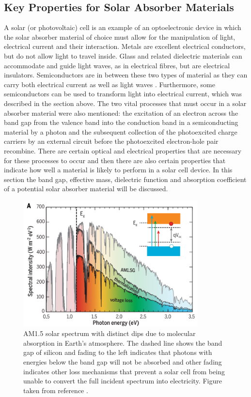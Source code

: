 \subsection{Key Properties for Solar Absorber Materials}\label{PV_properties}

A solar (or photovoltaic) cell is an example of an optoelectronic device in which the solar absorber material of choice must allow for the manipulation of light, electrical current and their interaction. Metals are excellent electrical conductors, but do not allow light to travel inside. Glass and related dielectric materials can accommodate and guide light waves, as in electrical fibres, but are electrical insulators. Semiconductors are in between these two types of material as they can carry both electrical current as well as light waves \cite{mat_prop1}. Furthermore, some semiconductors can be used to transform light into electrical current, which was described in the section above. The two vital processes that must occur in a solar absorber material were also mentioned: the excitation of an electron across the band gap from the valence band into the conduction band in a semiconducting material by a photon and the subsequent collection of the photoexcited charge carriers by an external circuit before the photoexcited electron-hole pair recombine. There are certain optical and electrical properties that are necessary for these processes to occur and then there are also certain properties that indicate how well a material is likely to perform in a solar cell device. In this section the band gap, effective mass, dielectric function and absorption coefficient of a potential solar absorber material will be discussed.

\begin{figure}[h!]
  \centering
    \includegraphics[width=0.85\textwidth]{figures/solar_spectrum2.png}
    \caption{AM1.5 solar spectrum with distinct dips due to molecular absorption in Earth’s atmosphere. The dashed line shows the band gap of silicon and fading to the left indicates that photons with energies below the band gap will not be absorbed and other fading indicates other loss mechanisms that prevent a solar cell from being unable to convert the full incident spectrum into electricity. Figure taken from reference .}
  \label{solar_spectrum}
\end{figure}

